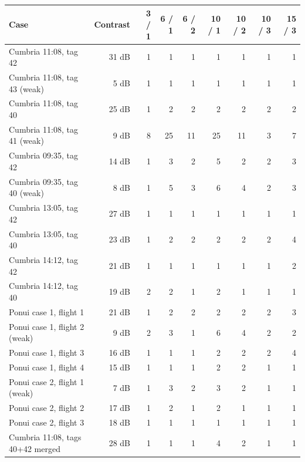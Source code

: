 \begin{tabular}{lrrrrrrrr}
\toprule
Case & Contrast & 3 / 1 & 6 / 1 & 6 / 2 & 10 / 1 & 10 / 2 & 10 / 3 & 15 / 3 \\
\midrule
Cumbria 11:08, tag 42 & 31 dB & 1 & 1 & 1 & 1 & 1 & 1 & 1 \\
Cumbria 11:08, tag 43 (weak) & 5 dB & 1 & 1 & 1 & 1 & 1 & 1 & 1 \\
Cumbria 11:08, tag 40 & 25 dB & 1 & 2 & 2 & 2 & 2 & 2 & 2 \\
Cumbria 11:08, tag 41 (weak) & 9 dB & 8 & 25 & 11 & 25 & 11 & 3 & 7 \\
Cumbria 09:35, tag 42 & 14 dB & 1 & 3 & 2 & 5 & 2 & 2 & 3 \\
Cumbria 09:35, tag 40 (weak) & 8 dB & 1 & 5 & 3 & 6 & 4 & 2 & 3 \\
Cumbria 13:05, tag 42 & 27 dB & 1 & 1 & 1 & 1 & 1 & 1 & 1 \\
Cumbria 13:05, tag 40 & 23 dB & 1 & 2 & 2 & 2 & 2 & 2 & 4 \\
Cumbria 14:12, tag 42 & 21 dB & 1 & 1 & 1 & 1 & 1 & 1 & 2 \\
Cumbria 14:12, tag 40 & 19 dB & 2 & 2 & 1 & 2 & 1 & 1 & 1 \\
Ponui case 1, flight 1 & 21 dB & 1 & 2 & 2 & 2 & 2 & 2 & 3 \\
Ponui case 1, flight 2 (weak) & 9 dB & 2 & 3 & 1 & 6 & 4 & 2 & 2 \\
Ponui case 1, flight 3 & 16 dB & 1 & 1 & 1 & 2 & 2 & 2 & 4 \\
Ponui case 1, flight 4 & 15 dB & 1 & 1 & 1 & 2 & 2 & 1 & 1 \\
Ponui case 2, flight 1 (weak) & 7 dB & 1 & 3 & 2 & 3 & 2 & 1 & 1 \\
Ponui case 2, flight 2 & 17 dB & 1 & 2 & 1 & 2 & 1 & 1 & 1 \\
Ponui case 2, flight 3 & 18 dB & 1 & 1 & 1 & 1 & 1 & 1 & 1 \\
Cumbria 11:08, tags 40+42 merged & 28 dB & 1 & 1 & 1 & 4 & 2 & 1 & 1 \\
\bottomrule
\end{tabular}
